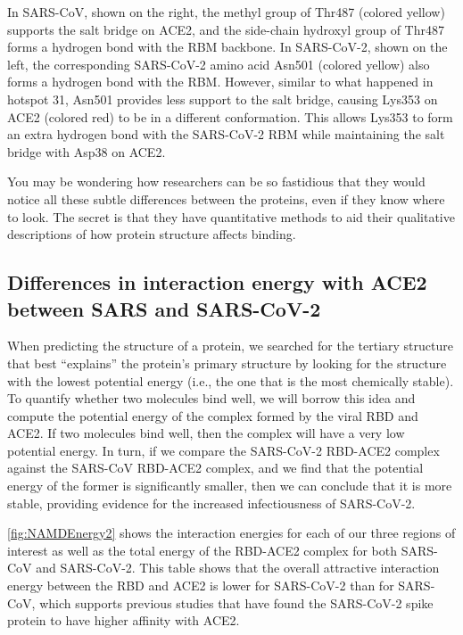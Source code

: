 In SARS-CoV, shown on the right, the methyl group of Thr487 (colored yellow) supports the salt bridge on ACE2, and the side-chain hydroxyl group of Thr487 forms a hydrogen bond with the RBM backbone. In SARS-CoV-2, shown on the left, the corresponding SARS-CoV-2 amino acid Asn501 (colored yellow) also forms a hydrogen bond with the RBM. However, similar to what happened in hotspot 31, Asn501 provides less support to the salt bridge, causing Lys353 on ACE2 (colored red) to be in a different conformation. This allows Lys353 to form an extra hydrogen bond with the SARS-CoV-2 RBM while maintaining the salt bridge with Asp38 on ACE2.

You may be wondering how researchers can be so fastidious that they would notice all these subtle differences between the proteins, even if they know where to look. The secret is that they have quantitative methods to aid their qualitative descriptions of how protein structure affects binding.

\FloatBarrier
{}
\subsection{Differences in interaction energy with ACE2 between SARS and SARS-CoV-2}

When predicting the structure of a protein, we searched for the tertiary structure that best ``explains'' the protein's primary structure by looking for the structure with the lowest potential energy (i.e., the one that is the most chemically stable). To quantify whether two molecules bind well, we will borrow this idea and compute the potential energy of the complex formed by the viral RBD and ACE2. If two molecules bind well, then the complex will have a very low potential energy. In turn, if we compare the SARS-CoV-2 RBD-ACE2 complex against the SARS-CoV RBD-ACE2 complex, and we find that the potential energy of the former is significantly smaller, then we can conclude that it is more stable, providing evidence for the increased infectiousness of SARS-CoV-2.

\autoref{fig:NAMDEnergy2} shows the interaction energies for each of our three regions of interest as well as the total energy of the RBD-ACE2 complex for both SARS-CoV and SARS-CoV-2. This table shows that the overall attractive interaction energy between the RBD and ACE2 is lower for SARS-CoV-2 than for SARS-CoV, which supports previous studies that have found the SARS-CoV-2 spike protein to have higher affinity with ACE2.\\

